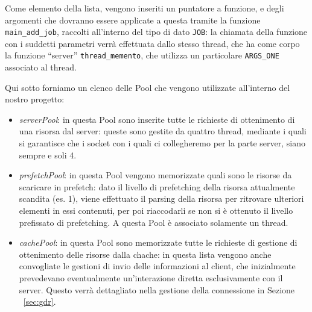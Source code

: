 Come elemento della lista, vengono inseriti un puntatore a funzione, e degli
argomenti che dovranno essere applicate a questa tramite la funzione
\texttt{main\_add\_job}, raccolti all'interno del tipo di dato \texttt{JOB}: la chiamata della funzione
con i suddetti parametri verrà effettuata dallo stesso thread, che ha come 
corpo la funzione ``server'' \texttt{thread\_memento}, che utilizza un particolare
\texttt{ARGS\_ONE} associato al thread.

Qui sotto forniamo un elenco delle Pool che vengono utilizzate all'interno
del nostro progetto:
\begin{itemize}
\item \textit{serverPool}: in questa Pool sono inserite tutte le richieste di 
	ottenimento di una risorsa dal server: queste sono gestite da quattro
	thread, mediante i quali si garantisce che i socket con i quali ci 
	collegheremo per la parte server, siano sempre e soli 4. 
\item \textit{prefetchPool}: in questa Pool vengono memorizzate quali sono le
	risorse da scaricare in prefetch: dato il livello di prefetching della
	risorsa attualmente scandita (es. 1), viene effettuato il parsing della
	risorsa per ritrovare ulteriori elementi in essi contenuti, per poi
	riaccodarli se non si è ottenuto il livello prefissato di prefetching.
	A questa Pool è associato solamente un thread.
\item \textit{cachePool}: in questa Pool sono memorizzate tutte le richieste di
	gestione di ottenimento delle risorse dalla chache: in questa lista
	vengono anche convogliate le gestioni di invio delle informazioni al 
	client, che inizialmente prevedevano eventualmente un'interazione 
	diretta esclusivamente con il server. Questo verrà dettagliato nella
	gestione della connessione in Sezione ~\vref{sec:gdr}.
\end{itemize}

